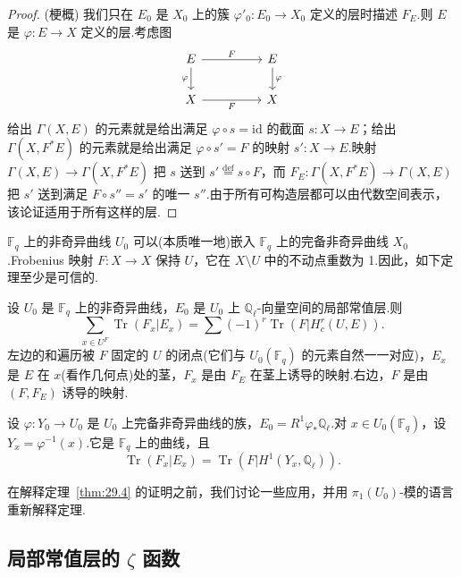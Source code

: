 \begin{proof}
(梗概) 我们只在 $E_0$ 是 $X_0$ 上的簇 $\varphi'_0 \colon E_0 \to X_0$ 定义的层时描述 $F_E$.则 $E$ 是 $\varphi \colon E \to X$ 定义的层.考虑图
\[
\begin{tikzcd}
E \arrow[d, "\varphi"'] \arrow[rr, "F"] & & E \arrow[d, "\varphi"] \\
X \arrow[rr, "F"'] & & X
\end{tikzcd}
\]
给出 $\Gamma(X, E)$ 的元素就是给出满足 $\varphi \circ s = \mathrm{id}$ 的截面 $s \colon X \to E$；给出 $\Gamma(X, F^{*}E)$ 的元素就是给出满足 $\varphi \circ s' = F$ 的映射 $s' \colon X \to E$.映射 $\Gamma(X, E) \to \Gamma(X, F^{*}E)$ 把 $s$ 送到 $s' \overset{\mathrm{def}}{=} s \circ F$，而 $F_E \colon \Gamma(X, F^{*}E) \to \Gamma(X, E)$ 把 $s'$ 送到满足 $F \circ s'' = s'$ 的唯一 $s''$.由于所有可构造层都可以由代数空间表示，该论证适用于所有这样的层.
\end{proof}

$\mathbb{F}_q$ 上的非奇异曲线 $U_0$ 可以(本质唯一地)嵌入 $\mathbb{F}_q$ 上的完备非奇异曲线 $X_0$.Frobenius 映射 $F \colon X \to X$ 保持 $U$，它在 $X \setminus U$ 中的不动点重数为 1.因此，如下定理至少是可信的.

\begin{theorem}\label{thm:29.4}
设 $U_0$ 是 $\mathbb{F}_q$ 上的非奇异曲线，$E_0$ 是 $U_0$ 上 $\mathbb{Q}_{\ell}$-向量空间的局部常值层.则
\[
\sum_{x \in U^{F}} \operatorname{Tr}(F_x|E_x) = \sum (-1)^{r} \operatorname{Tr}(F|H^{r}_{c}(U, E)).
\]
左边的和遍历被 $F$ 固定的 $U$ 的闭点(它们与 $U_0(\mathbb{F}_q)$ 的元素自然一一对应)，$E_x$ 是 $E$ 在 $x$(看作几何点)处的茎，$F_x$ 是由 $F_E$ 在茎上诱导的映射.右边，$F$ 是由 $(F, F_E)$ 诱导的映射.
\end{theorem}

\begin{example}\label{ex:29.5}
设 $\varphi \colon Y_0 \to U_0$ 是 $U_0$ 上完备非奇异曲线的族，$E_0 = R^{1}\varphi_{*}\mathbb{Q}_{\ell}$.对 $x \in U_0(\mathbb{F}_q)$，设 $Y_x = \varphi^{-1}(x)$.它是 $\mathbb{F}_q$ 上的曲线，且
\[
\operatorname{Tr}(F_x|E_x) = \operatorname{Tr}(F|H^{1}(Y_x, \mathbb{Q}_{\ell})).
\]
\end{example}

在解释定理~\ref{thm:29.4} 的证明之前，我们讨论一些应用，并用 $\pi_1(U_0)$-模的语言重新解释定理.

\subsection*{\texorpdfstring{局部常值层的 $\zeta$ 函数}{局部常值层的 zeta 函数}}

